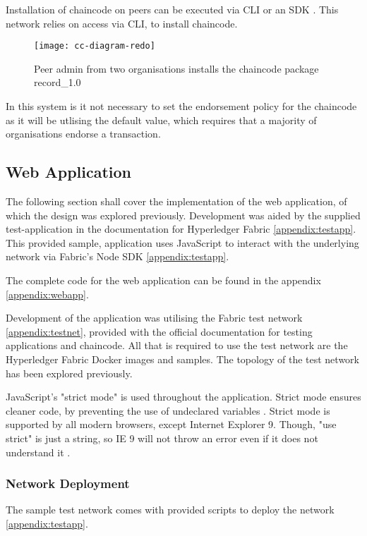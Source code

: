 Installation of chaincode on peers can be executed via CLI or an SDK \cite{noauthor_fabric_nodate}. 
This network relies on access via CLI, to install chaincode. 



\begin{figure}[H]
  \texttt{[image: cc-diagram-redo]}
  \caption{Peer admin from two organisations installs the chaincode package record\_1.0}
\end{figure}

In this system is it not necessary to set the endorsement policy for the chaincode as it will be utlising the default value, which requires that a majority of organisations endorse a transaction. \cite{noauthor_fabric_nodate}


\subsection{Web Application}
The following section shall cover the implementation of the web application, of which the design was explored previously. 
Development was aided by the supplied test-application in the documentation for Hyperledger Fabric \ref{appendix:testapp}.
This provided sample, application uses JavaScript to interact with the underlying network via Fabric's Node SDK \ref{appendix:testapp}.

The complete code for the web application can be found in the appendix \ref{appendix:webapp}.

Development of the application was utilising the Fabric test network \ref{appendix:testnet}, provided with the official documentation for testing applications and chaincode.
All that is required to use the test network are the Hyperledger Fabric Docker images and samples. \cite{noauthor_using_nodate}
The topology of the test network has been explored previously. 

JavaScript's "strict mode" is used throughout the application. 
Strict mode ensures cleaner code, by preventing the use of undeclared variables \cite{noauthor_referenceerror_nodate}. 
Strict mode is supported by all modern browsers, except Internet Explorer 9. Though, "use strict" is just a string, so IE 9 will not throw an error even if it does not understand it \cite{noauthor_javascript_nodate}.

\subsubsection{Network Deployment}
The sample test network comes with provided scripts to deploy the network \ref{appendix:testapp}. 

